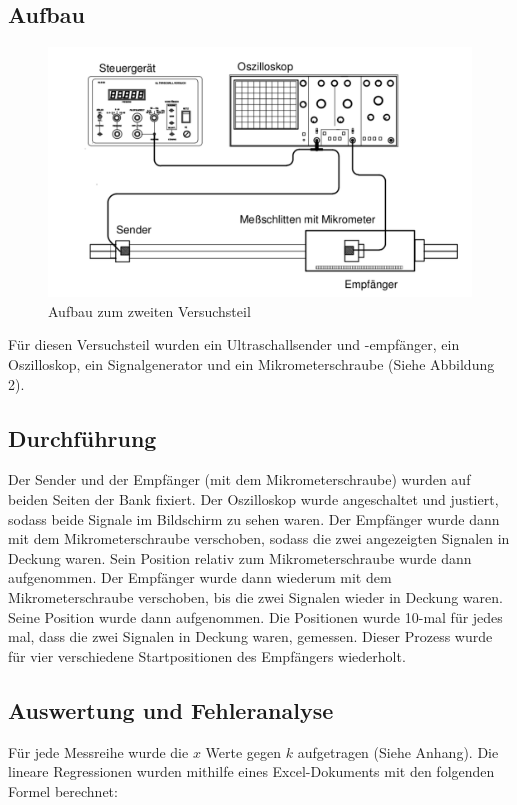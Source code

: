 \documentclass[11pt,a4paper]{article}
\begin{document}
\subsection{Aufbau}
\begin{figure}
	\centering
	\includegraphics[scale=0.5]{Abb2}
	\caption{Aufbau zum zweiten Versuchsteil}
\end{figure}

Für diesen Versuchsteil wurden ein Ultraschallsender und -empfänger, ein Oszilloskop, ein Signalgenerator und ein Mikrometerschraube (Siehe Abbildung 2). 

\subsection{Durchführung}
Der Sender und der Empfänger (mit dem Mikrometerschraube) wurden auf beiden Seiten der Bank fixiert. Der Oszilloskop wurde angeschaltet und justiert, sodass beide Signale im Bildschirm zu sehen waren. Der Empfänger wurde dann mit dem Mikrometerschraube verschoben, sodass die zwei angezeigten Signalen in Deckung waren. Sein Position relativ zum Mikrometerschraube wurde dann aufgenommen. Der Empfänger wurde dann wiederum mit dem Mikrometerschraube verschoben, bis die zwei Signalen wieder in Deckung waren. Seine Position wurde dann aufgenommen. Die Positionen wurde 10-mal für jedes mal, dass die zwei Signalen in Deckung waren, gemessen. Dieser Prozess wurde für vier verschiedene Startpositionen des Empfängers wiederholt. 



\subsection{Auswertung und Fehleranalyse}
Für jede Messreihe wurde die $x$ Werte gegen $k$ aufgetragen (Siehe Anhang). Die lineare Regressionen wurden mithilfe eines Excel-Dokuments mit den folgenden Formel berechnet: 
\end{document}
